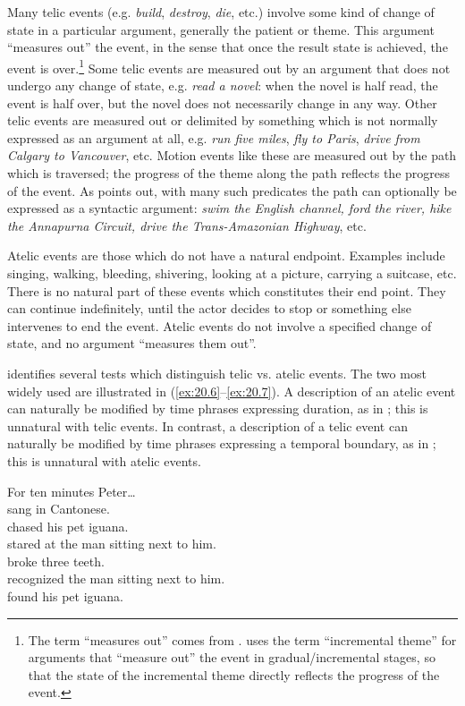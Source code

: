 Many telic events (e.g. \textit{build}, \textit{destroy}, \textit{die}, etc.) involve some kind of change of state in a particular argument, generally the patient or theme. This argument “measures out” the event, in the sense that once the result state is achieved, the event is over.\footnote{The term “measures out” comes from \citet{Tenny1987}. \citet{Dowty1991} uses the term “incremental theme” for arguments that “measure out” the event in gradual/incremental stages, so that the state of the incremental theme directly reflects the progress of the event.} Some telic events are measured out by an argument that does not undergo any change of state, e.g. \textit{read a novel}: when the novel is half read, the event is half over, but the novel does not necessarily change in any way. Other telic events are measured out or delimited by something which is not normally expressed as an argument at all, e.g. \textit{run five miles}, \textit{fly to Paris}, \textit{drive from Calgary to Vancouver}, etc. Motion events like these are measured out by the path which is traversed; the progress of the theme along the path reflects the progress of the event. As \citet{Dowty1991} points out, with many such predicates the path can optionally be expressed as a syntactic argument: \textit{swim the English channel, ford the river, hike the Annapurna Circuit, drive the Trans-Amazonian Highway}, etc.



Atelic events are those which do not have a natural endpoint. Examples include singing, walking, bleeding, shivering, looking at a picture, carrying a suitcase, etc. There is no natural part of these events which constitutes their end point. They can continue indefinitely, until the actor decides to stop or something else intervenes to end the event. Atelic events do not involve a specified change of state, and no argument “measures them out”.



\citet{Dowty1979} identifies several tests which distinguish telic vs. atelic events. The two most widely used are illustrated in (\ref{ex:20.6}--\ref{ex:20.7}). A description of an atelic event can naturally be modified by time phrases expressing duration, as in ; this is unnatural with telic events. In contrast, a description of a telic event can naturally be modified by time phrases expressing a temporal boundary, as in ; this is unnatural with atelic events.


\ea \label{ex:20.6}
For ten minutes Peter…\\
\ea  sang in Cantonese.\\
\ex chased his pet iguana.\\
\ex stared at the man sitting next to him.\\
\ex *broke three teeth.\\
\ex *recognized the man sitting next to him.\\
\ex *found his pet iguana.
                       \z
\z

